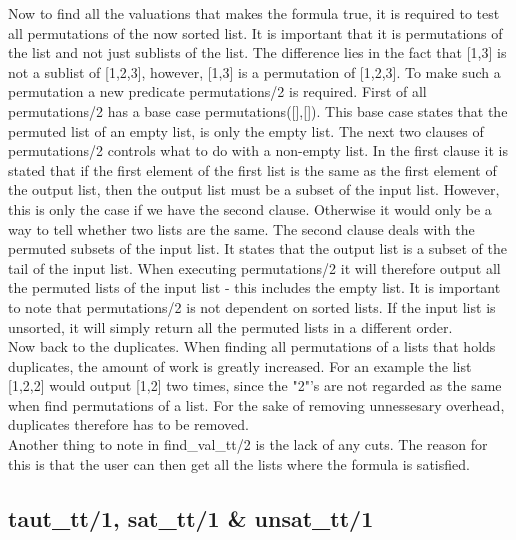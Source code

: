 \documentclass[a4paper,10pt]{article}
\begin{document}
Now to find all the valuations that makes the formula true, it is required to test all permutations of the now sorted list. It is important that it is permutations of the list and not just sublists of the list. The difference lies in the fact that [1,3] is not a sublist of [1,2,3], however, [1,3] is a permutation of [1,2,3]. To make such a permutation a new predicate \textsf{permutations/2} is required. First of all \textsf{permutations/2} has a base case \textsf{permutations([],[]).} This base case states that the permuted list of an empty list, is only the empty list. The next two clauses of \textsf{permutations/2} controls what to do with a non-empty list. In the first clause it is stated that if the first element of the first list is the same as the first element of the output list, then the output list must be a subset of the input list. However, this is only the case if we have the second clause. Otherwise it would only be a way to tell whether two lists are the same. The second clause deals with the permuted subsets of the input list. It states that the output list is a subset of the tail of the input list. When executing \textsf{permutations/2} it will therefore output all the permuted lists of the input list - this includes the empty list. It is important to note that \textsf{permutations/2} is not dependent on sorted lists. If the input list is unsorted, it will simply return all the permuted lists in a different order.\\
Now back to the duplicates. When finding all permutations of a lists that holds duplicates, the amount of work is greatly increased. For an example the list [1,2,2] would output [1,2] two times, since the "2"'s are not regarded as the same when find permutations of a list. For the sake of removing unnessesary overhead, duplicates therefore has to be removed.\\
Another thing to note in \textsf{find\_val\_tt/2} is the lack of any cuts. The reason for this is that the user can then get all the lists where the formula is satisfied.
\subsection{taut\_tt/1, sat\_tt/1 \& unsat\_tt/1}
\end{document}
